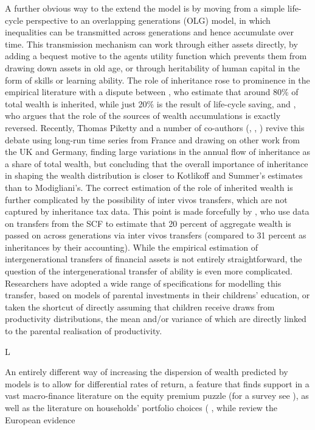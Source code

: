 A further obvious way to the extend the model is by moving from a simple life-
cycle perspective to an overlapping generations (OLG) model, in which inequalities
can be transmitted across generations and hence accumulate over time. This 
transmission mechanism can work through either assets directly, by adding 
a bequest motive to the agents utility function which prevents them from drawing
down assets in old age, or through heritability of human capital in the form 
of skills or learning ability. The role of inheritance rose to prominence in the 
empirical literature with a dispute between \citet{KotlikoffSummers1981}, who 
estimate that around 80\% of total wealth is inherited, while just 20\% is 
the result of life-cycle saving, and \citet{Modigliani1986}, who argues that the 
role of the sources of wealth accumulations is exactly reversed. Recently, Thomas
Piketty and a number of co-authors (\citealt{Piketty2011}, 
\citealt{PikettyPostelRosenthal2014}, \citealt{PikettyZucman2015}) revive this
debate using long-run time series from France and drawing on other work from 
the UK and Germany, finding large variations in the annual flow of inheritance
as a share of total wealth, but concluding that the overall importance of inheritance
in shaping the wealth distribution is closer to Kotlikoff and Summer's estimates
than to Modigliani's. The correct estimation of the role of inherited wealth is
further complicated by the possibility of inter vivos transfers, which are not
captured by inheritance tax data. This point is made forcefully by 
\citet{GaleScholz1994}, who use data on transfers from the SCF to estimate that
20 percent of aggregate wealth is passed on across generations via inter vivos
transfers (compared to 31 percent as inheritances by their accounting). While
the empirical estimation of intergenerational transfers of financial assets is
not entirely straightforward, the question of the intergenerational transfer 
of ability is even more complicated. Researchers have adopted a wide range of 
specifications for modelling this transfer, based on models of parental 
investments in their childrens' education, or taken the shortcut of directly 
assuming that children receive draws from productivity distributions, the 
mean and/or variance of which are directly linked to the parental realisation 
of productivity. 

L



\citet{Floden2008}
An entirely different way of increasing the dispersion of wealth predicted by 
models is to allow for differential rates of return, a feature that finds 
support in a vast macro-finance literature on the equity premium puzzle (for 
a survey see \cite{SiegelThaler1997}), as well as the literature on households'
portfolio choices ( , while \citet{GuisoHaliassosJiappeli2003} review the 
European evidence

